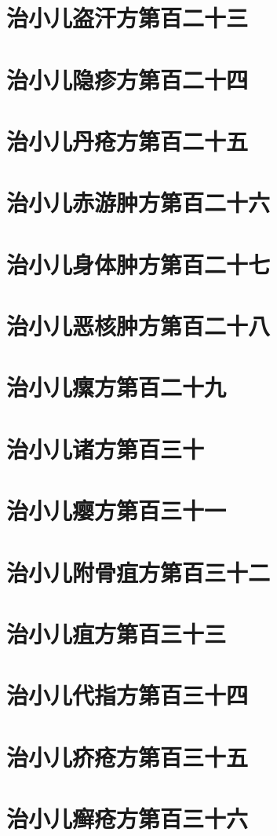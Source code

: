 \documentclass[a4paper,12pt,UTF8,twoside]{ctexbook}
\begin{document}
\chapter{治小儿盗汗方第百二十三}
\chapter{治小儿隐疹方第百二十四}
\chapter{治小儿丹疮方第百二十五}
\chapter{治小儿赤游肿方第百二十六}
\chapter{治小儿身体肿方第百二十七}
\chapter{治小儿恶核肿方第百二十八}
\chapter{治小儿瘰方第百二十九}
\chapter{治小儿诸方第百三十}
\chapter{治小儿瘿方第百三十一}
\chapter{治小儿附骨疽方第百三十二}
\chapter{治小儿疽方第百三十三}
\chapter{治小儿代指方第百三十四}
\chapter{治小儿疥疮方第百三十五}
\chapter{治小儿癣疮方第百三十六}
\end{document}
